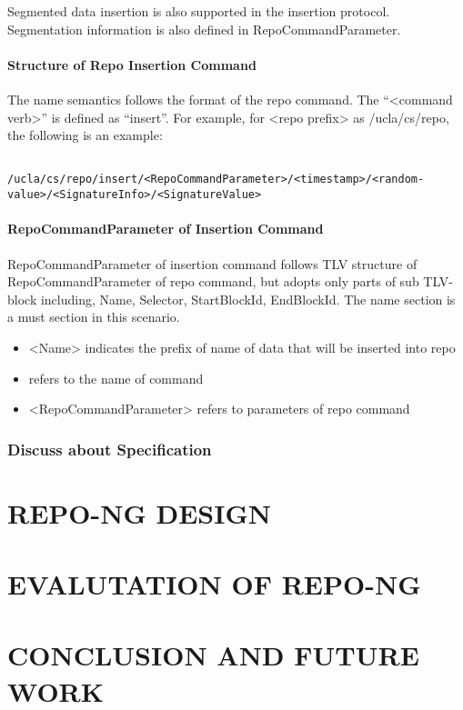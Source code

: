 \documentclass{acm_proc_article-sp}
\begin{document}
Segmented data insertion is also supported in the insertion protocol. Segmentation information is also defined in RepoCommandParameter.

\paragraph{Structure of Repo Insertion Command}
The name semantics follows the format of the repo command. The ``<command verb>'' is defined as ``insert''. For example, for <repo prefix> as /ucla/cs/repo, the following is an example:

\begin{figure*}
\begin{framed}
\begin{BVerbatim}

/ucla/cs/repo/insert/<RepoCommandParameter>/<timestamp>/<random-value>/<SignatureInfo>/<SignatureValue>

\end{BVerbatim}
\end{framed}
\end{figure*}

\paragraph{RepoCommandParameter of Insertion Command}
RepoCommandParameter of insertion command follows TLV structure of RepoCommandParameter of repo command, but adopts only parts of sub TLV-block including, Name, Selector, StartBlockId, EndBlockId. The name section is a must section in this scenario.

\begin{itemize}
\item <Name> indicates the prefix of name of data that will be inserted into repo
\item <command verb> refers to the name of command
\item <RepoCommandParameter> refers to parameters of repo command
\end{itemize}


\subsubsection{Discuss about Specification}



\section{REPO-NG DESIGN}

\section{EVALUTATION OF REPO-NG}

\section{CONCLUSION AND FUTURE WORK}



\end{document}
